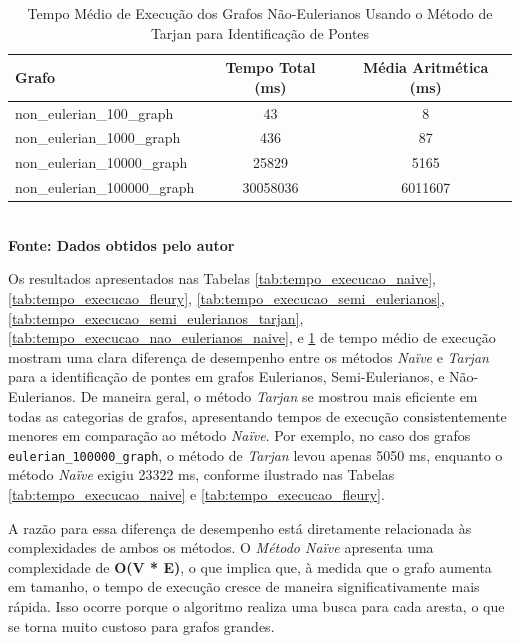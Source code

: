 \begin{table}[htb]
	\centering
	\caption{\hspace{0.1cm} Tempo Médio de Execução dos Grafos Não-Eulerianos Usando o Método de Tarjan para Identificação de Pontes}
	\vspace{-0.3cm} %
	\label{tab:tempo_execucao_nao_eulerianos_tarjan}
	\begin{tabular}{l|c|c}
    \hline
    \textbf{Grafo} & \textbf{Tempo Total (ms)} & \textbf{Média Aritmética (ms)} \\
    \hline
     non\_eulerian\_100\_graph & 43 & 8 \\
     non\_eulerian\_1000\_graph & 436 & 87 \\
     non\_eulerian\_10000\_graph & 25829 & 5165 \\
     non\_eulerian\_100000\_graph & 30058036 & 6011607 \\
    \hline
 \end{tabular}
 	\vspace{.1cm}  %
	\small
	{\footnotesize\\ \textbf{Fonte: Dados obtidos pelo autor}}
\end{table}

Os resultados apresentados nas Tabelas \ref{tab:tempo_execucao_naive}, \ref{tab:tempo_execucao_fleury}, \ref{tab:tempo_execucao_semi_eulerianos}, \ref{tab:tempo_execucao_semi_eulerianos_tarjan}, \ref{tab:tempo_execucao_nao_eulerianos_naive}, e \ref{tab:tempo_execucao_nao_eulerianos_tarjan} de tempo médio de execução mostram uma clara diferença de desempenho entre os métodos \textit{Naïve} e \textit{Tarjan} para a identificação de pontes em grafos Eulerianos, Semi-Eulerianos, e Não-Eulerianos. De maneira geral, o método \textit{Tarjan} se mostrou mais eficiente em todas as categorias de grafos, apresentando tempos de execução consistentemente menores em comparação ao método \textit{Naïve}. Por exemplo, no caso dos grafos \texttt{eulerian\_100000\_graph}, o método de \textit{Tarjan} levou apenas 5050 ms, enquanto o método \textit{Naïve} exigiu 23322 ms, conforme ilustrado nas Tabelas \ref{tab:tempo_execucao_naive} e \ref{tab:tempo_execucao_fleury}.

A razão para essa diferença de desempenho está diretamente relacionada às complexidades de ambos os métodos. O \textit{Método Naïve} apresenta uma complexidade de \textbf{O(V * E)}, o que implica que, à medida que o grafo aumenta em tamanho, o tempo de execução cresce de maneira significativamente mais rápida. Isso ocorre porque o algoritmo realiza uma busca para cada aresta, o que se torna muito custoso para grafos grandes.

